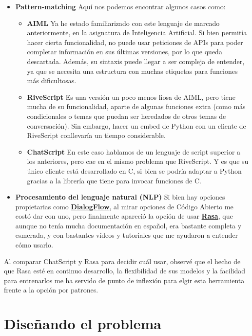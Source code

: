 \begin{itemize}
	\item \textbf{Pattern-matching}
	Aquí nos podemos encontrar algunos casos como:
	\begin{itemize}
		\item \textbf{AIML} Ya he estado familiarizado con este lenguaje de marcado anteriormente, en la asignatura de Inteligencia Artificial. Si bien permitía hacer cierta funcionalidad, no puede usar peticiones de APIs para poder completar información en sus últimas versiones, por lo que queda descartada. Además, su sintaxis puede llegar a ser compleja de entender, ya que se necesita una estructura con muchas etiquetas para funciones más dificultosas.
		\item \textbf{RiveScript} Es una versión un poco menos liosa de AIML, pero tiene mucha de su funcionalidad, aparte de algunas funciones extra (como más condicionales o temas que puedan ser heredados de otros temas de conversación). Sin embargo, hacer un embed de Python con un cliente de RiveScript conllevaría un tiempo considerable.
		\item \textbf{ChatScript} En este caso hablamos de un lenguaje de script superior a los anteriores, pero cae en el mismo problema que RiveScript. Y es que su único cliente está desarrollado en C, si bien se podría adaptar a Python gracias a la librería que tiene para invocar funciones de C.
	\end{itemize}	
	\item \textbf{Procesamiento del lenguaje natural (NLP)}
	Si bien hay opciones propietarias como \textbf{\underline{DialogFlow}}, al mirar opciones de Código Abierto me costó dar con uno, pero finalmente apareció la opción de usar \textbf{\underline{Rasa}}, que aunque no tenía mucha documentación en español, era bastante completa y esmerada, y con bastantes vídeos y tutoriales que me ayudaron a entender cómo usarlo.
\end{itemize}

Al comparar ChatScript y Rasa para decidir cuál usar, observé que el hecho de que Rasa esté en continuo desarrollo, la flexibilidad de sus modelos y la facilidad para entrenarlos me ha servido de punto de inflexión para elgir esta herramienta frente a la opción por patrones.
	
\section{Diseñando el problema}

